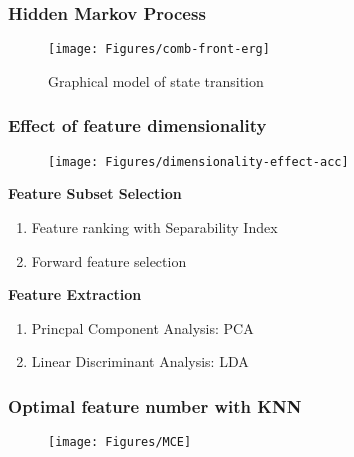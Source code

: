 \documentclass[serif,mathserif]{beamer}
\begin{document}
\begin{frame}
	\frametitle{Hidden Markov Process}
	\begin{figure}[t]
		\texttt{[image: Figures/comb-front-erg]}
		\caption{Graphical model of state transition}
	\end{figure}
\end{frame}

\begin{frame}
	\frametitle{Effect of feature dimensionality}
	\begin{figure}[t]
		\texttt{[image: Figures/dimensionality-effect-acc]}
	\end{figure}
\end{frame}

\begin{frame}
	\textbf{Feature Subset Selection}
	\newline
	\newline
	\begin{enumerate}
		\item Feature ranking with Separability Index\pause
		\newline
		\newline
		\item Forward feature selection 
	\end{enumerate}
\end{frame}

\begin{frame}
	\textbf{Feature Extraction}
	\newline
	\newline
	\begin{enumerate}
		\item Princpal Component Analysis: PCA \pause
		\newline
		\newline
		\item Linear Discriminant Analysis: LDA
	\end{enumerate}
\end{frame}


\begin{frame}
	\frametitle{Optimal feature number with KNN}
	\begin{figure}[t]
		\texttt{[image: Figures/MCE]}
		\label{fig:opt-dim}
	\end{figure}
\end{frame}
\end{document}
